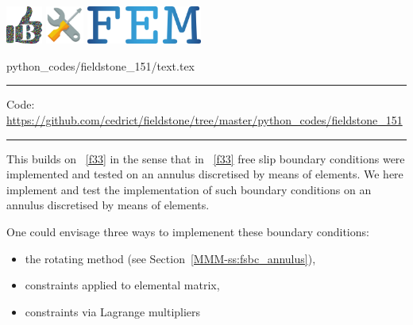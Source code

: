 \includegraphics[height=1.25cm]{images/pictograms/benchmark}
\includegraphics[height=1.25cm]{images/pictograms/tools}
\includegraphics[height=1.25cm]{images/pictograms/FEM}


\begin{flushright} {\tiny {\color{gray} python\_codes/fieldstone\_151/text.tex}} \end{flushright}



\par\noindent\rule{\textwidth}{0.4pt}

\begin{center}
\inpython
{\small Code: \url{https://github.com/cedrict/fieldstone/tree/master/python_codes/fieldstone_151}}
\end{center}

\par\noindent\rule{\textwidth}{0.4pt}


This \stone builds on \stone~\ref{f33} in the sense that in \stone~\ref{f33} 
free slip boundary conditions were implemented and tested on an annulus discretised 
by means of \QonePzero{} elements. We here implement and test the implementation 
of such boundary conditions on an annulus discretised by means of \QtwoQone{} elements.

One could envisage three ways to implemenent these boundary conditions:
\begin{itemize}
\item the rotating method (see Section~\ref{MMM-ss:fsbc_annulus}),
\item constraints applied to elemental matrix,
\item constraints via Lagrange multipliers
\end{itemize}

